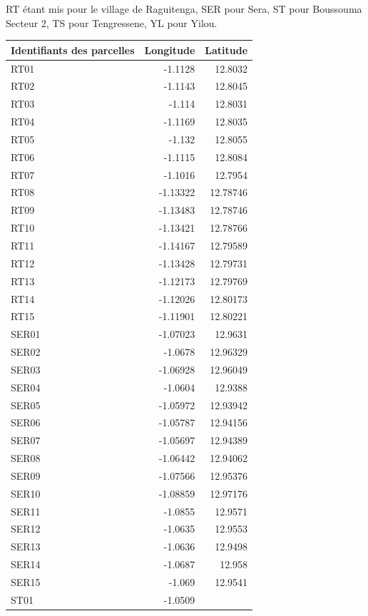 \documentclass[a4paper,11pt]{article}
\begin{document}
RT étant mis pour le village de Raguitenga, SER pour Sera, ST pour
Boussouma Secteur 2, TS pour Tengressene, YL pour Yilou.
\begin{table}
    \begin{center}
     \begin{tabular}{|l|r|r|}
       \hline Identifiants des parcelles & Longitude & Latitude
       \\ \hline RT01 & -1.1128 & 12.8032 \\ RT02 & -1.1143 & 12.8045
       \\ RT03 & -1.114 & 12.8031 \\ RT04 & -1.1169 & 12.8035 \\ RT05
       & -1.132 & 12.8055 \\ RT06 & -1.1115 & 12.8084 \\ RT07 &
       -1.1016 & 12.7954 \\ RT08 & -1.13322 & 12.78746 \\ RT09 &
       -1.13483 & 12.78746 \\ RT10 & -1.13421 & 12.78766 \\ RT11 &
       -1.14167 & 12.79589 \\ RT12 & -1.13428 & 12.79731 \\ RT13 &
       -1.12173 & 12.79769 \\ RT14 & -1.12026 & 12.80173 \\ RT15 &
       -1.11901 & 12.80221 \\ SER01 & -1.07023 & 12.9631 \\ SER02 &
       -1.0678 & 12.96329 \\ SER03 & -1.06928 & 12.96049 \\ SER04 &
       -1.0604 & 12.9388 \\ SER05 & -1.05972 & 12.93942 \\ SER06 &
       -1.05787 & 12.94156 \\ SER07 & -1.05697 & 12.94389 \\ SER08 &
       -1.06442 & 12.94062 \\ SER09 & -1.07566 & 12.95376 \\ SER10 &
       -1.08859 & 12.97176 \\ SER11 & -1.0855 & 12.9571 \\ SER12 &
       -1.0635 & 12.9553 \\ SER13 & -1.0636 & 12.9498 \\ SER14 &
       -1.0687 & 12.958 \\ SER15 & -1.069 & 12.9541 \\ ST01 & -1.0509

\end{tabular}
\end{center}
\end{table}
\end{document}
